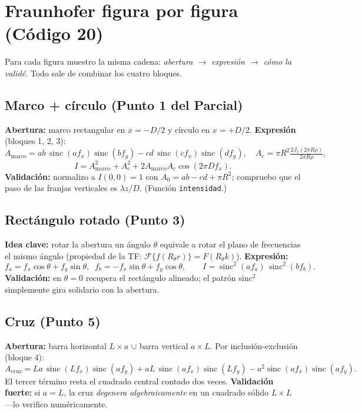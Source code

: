 \documentclass[11pt,a4paper]{article}
\newcommand{\sinc}{\operatorname{sinc}}
\newcommand{\Fou}{\mathcal{F}}
\begin{document}
\section{Fraunhofer figura por figura (Código 20)}

Para cada figura muestro la misma cadena: \emph{abertura $\to$ expresión
$\to$ cómo la validé}. Todo sale de combinar los cuatro bloques.

\subsection{Marco + círculo (Punto 1 del Parcial)}
\textbf{Abertura:} marco rectangular en $x=-D/2$ y círculo en $x=+D/2$.
\textbf{Expresión} (bloques 1, 2, 3):
\[
A_\text{marco}=ab\,\sinc(af_x)\sinc(bf_y)-cd\,\sinc(cf_x)\sinc(df_y),\quad
A_\text{c}=\pi R^2\tfrac{2J_1(2\pi R\rho)}{2\pi R\rho},
\]
\[
I=A_\text{marco}^2+A_\text{c}^2+2A_\text{marco}A_\text{c}\cos(2\pi D f_x).
\]
\textbf{Validación:} normalizo a $I(0,0)=1$ con $A_0=ab-cd+\pi R^2$; compruebo que
el paso de las franjas verticales es $\lambda z/D$. (Función \texttt{intensidad}.)

\subsection{Rectángulo rotado (Punto 3)}
\textbf{Idea clave:} rotar la abertura un ángulo $\theta$ equivale a rotar el plano
de frecuencias el mismo ángulo (propiedad de la TF: $\Fou\{f(R_\theta r)\}=
F(R_\theta k)$). \textbf{Expresión:}
\[
f_a=f_x\cos\theta+f_y\sin\theta,\;\; f_b=-f_x\sin\theta+f_y\cos\theta,
\qquad I=\sinc^2(af_a)\,\sinc^2(bf_b).
\]
\textbf{Validación:} en $\theta=0$ recupera el rectángulo alineado; el patrón
sinc$^2$ simplemente gira solidario con la abertura.

\subsection{Cruz (Punto 5)}
\textbf{Abertura:} barra horizontal $L\times a$ $\cup$ barra vertical $a\times L$.
Por inclusión-exclusión (bloque 4):
\[
A_\text{cruz}=La\,\sinc(Lf_x)\sinc(af_y)+aL\,\sinc(af_x)\sinc(Lf_y)
-a^2\sinc(af_x)\sinc(af_y).
\]
El tercer término resta el cuadrado central contado dos veces.
\textbf{Validación fuerte:} si $a=L$, la cruz \emph{degenera algebraicamente} en un
cuadrado sólido $L\times L$ ---lo verifico numéricamente.
\end{document}
